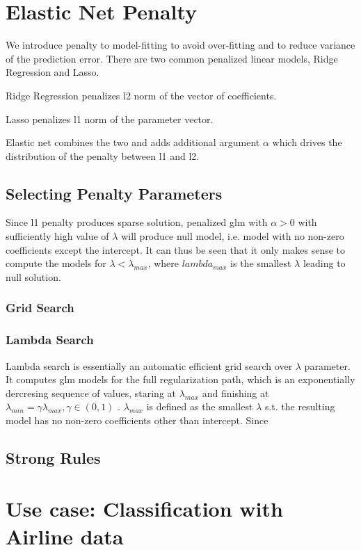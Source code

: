 \documentclass[11pt]{article}
\begin{document}
\section{Elastic Net Penalty} 
We introduce penalty to model-fitting to avoid over-fitting and to reduce variance of the prediction error. There are two common penalized linear models, Ridge Regression and Lasso. 

Ridge Regression penalizes l2 norm of the vector of coefficients. 

Lasso penalizes l1 norm of the parameter vector.

Elastic net combines the two and adds additional argument $\alpha$ which drives the distribution of the penalty between l1 and l2.

\subsection{Selecting Penalty Parameters}

Since l1 penalty produces sparse solution, penalized glm with $\alpha > 0$ with sufficiently high value of $\lambda$ will produce null model, i.e. model with no non-zero coefficients except the intercept. It can thus be seen that it only makes sense to compute the models for $\lambda < \lambda_{max}$, where $lambda_{max}$ is the smallest $\lambda$ leading to null solution.

\subsubsection{Grid Search}
\subsubsection{Lambda Search}
Lambda search is essentially an automatic efficient grid search over $\lambda$ parameter. It computes glm models for the full regularization path, which is an exponentially dercresing sequence of values, staring at $\lambda_{max}$ and finishing at $\lambda_{min} = \gamma\lambda_{max}, \gamma \in (0,1)$ . $\lambda_{max}$ is defined as the smallest $\lambda$ s.t. the resulting model has no non-zero coefficients other than intercept. Since 



\subsection{Strong Rules}


\section{Use case: Classification with Airline data} \label{3}
\end{document}
